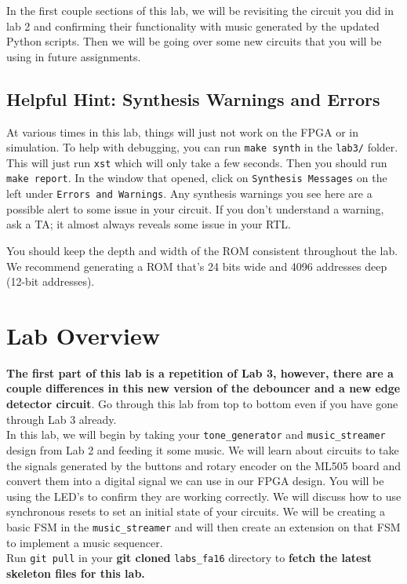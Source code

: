 \documentclass[11pt]{article}
\begin{document}
In the first couple sections of this lab, we will be revisiting the circuit you did in lab 2 and confirming their functionality with music generated by the updated Python scripts. Then we will be going over some new circuits that you will be using in future assignments.

\subsection{Helpful Hint: Synthesis Warnings and Errors}
At various times in this lab, things will just not work on the FPGA or in simulation. To help with debugging, you can run \verb|make synth| in the \verb|lab3/| folder. This will just run \verb|xst| which will only take a few seconds. Then you should run \verb|make report|. In the window that opened, click on \verb|Synthesis Messages| on the left under \verb|Errors and Warnings|. Any synthesis warnings you see here are a possible alert to some issue in your circuit. If you don't understand a warning, ask a TA; it almost always reveals some issue in your RTL.

You should keep the depth and width of the ROM consistent throughout the lab. We recommend generating a ROM that's 24 bits wide and 4096 addresses deep (12-bit addresses).
\section{Lab Overview}

\textbf{The first part of this lab is a repetition of Lab 3, however, there are a couple differences in this new version of the debouncer and a new edge detector circuit}. Go through this lab from top to bottom even if you have gone through Lab 3 already.\\

In this lab, we will begin by taking your \verb|tone_generator| and \verb|music_streamer| design from Lab 2 and feeding it some music. We will learn about circuits to take the signals generated by the buttons and rotary encoder on the ML505 board and convert them into a digital signal we can use in our FPGA design. You will be using the LED's to confirm they are working correctly. We will discuss how to use synchronous resets to set an initial state of your circuits. We will be creating a basic FSM in the \verb|music_streamer| and will then create an extension on that FSM to implement a music sequencer. \\

Run \verb|git pull| in your \textbf{git cloned} \verb|labs_fa16| directory to \textbf{fetch the latest skeleton files for this lab.}
\end{document}

